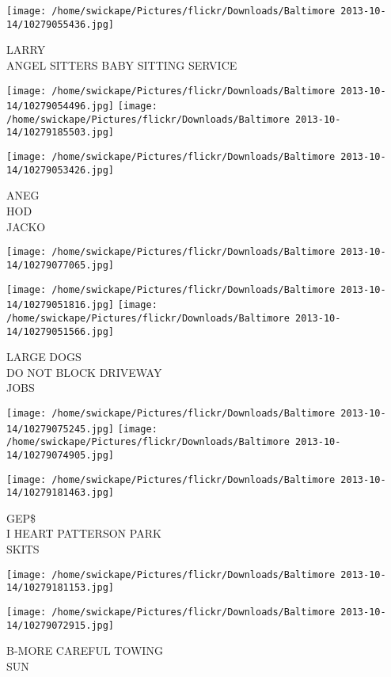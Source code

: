\documentclass[10pt,letterpaper]{article}
\begin{document}
\vspace{0.25in}
\texttt{[image: /home/swickape/Pictures/flickr/Downloads/Baltimore 2013-10-14/10279055436.jpg]}

LARRY\\
ANGEL SITTERS BABY SITTING SERVICE
\pagebreak

\texttt{[image: /home/swickape/Pictures/flickr/Downloads/Baltimore 2013-10-14/10279054496.jpg]}
\texttt{[image: /home/swickape/Pictures/flickr/Downloads/Baltimore 2013-10-14/10279185503.jpg]}

\vspace{0.25in}
\texttt{[image: /home/swickape/Pictures/flickr/Downloads/Baltimore 2013-10-14/10279053426.jpg]}

ANEG\\
HOD\\
JACKO
\pagebreak

\texttt{[image: /home/swickape/Pictures/flickr/Downloads/Baltimore 2013-10-14/10279077065.jpg]}

\vspace{0.25in}
\texttt{[image: /home/swickape/Pictures/flickr/Downloads/Baltimore 2013-10-14/10279051816.jpg]}
\texttt{[image: /home/swickape/Pictures/flickr/Downloads/Baltimore 2013-10-14/10279051566.jpg]}

LARGE DOGS\\
DO NOT BLOCK DRIVEWAY\\
JOBS
\pagebreak

\texttt{[image: /home/swickape/Pictures/flickr/Downloads/Baltimore 2013-10-14/10279075245.jpg]}
\texttt{[image: /home/swickape/Pictures/flickr/Downloads/Baltimore 2013-10-14/10279074905.jpg]}

\texttt{[image: /home/swickape/Pictures/flickr/Downloads/Baltimore 2013-10-14/10279181463.jpg]}

GEP\$\\
I HEART PATTERSON PARK\\
SKITS
\pagebreak

\texttt{[image: /home/swickape/Pictures/flickr/Downloads/Baltimore 2013-10-14/10279181153.jpg]}

\vspace{0.25in}
\texttt{[image: /home/swickape/Pictures/flickr/Downloads/Baltimore 2013-10-14/10279072915.jpg]}

B{-}MORE CAREFUL TOWING\\
SUN
\pagebreak
\end{document}
